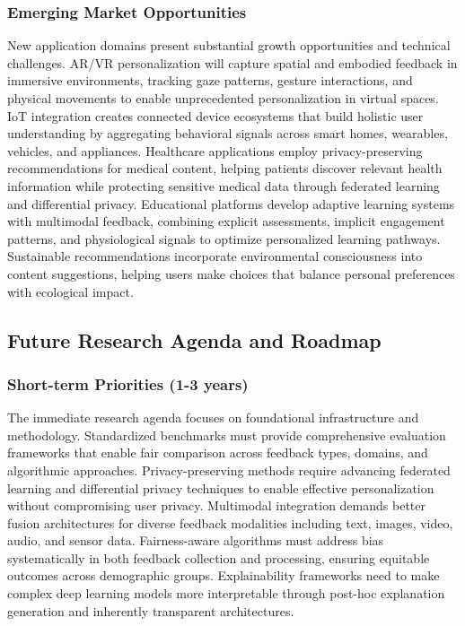 \subsubsection{Emerging Market Opportunities}

New application domains present substantial growth opportunities and technical challenges. AR/VR personalization will capture spatial and embodied feedback in immersive environments, tracking gaze patterns, gesture interactions, and physical movements to enable unprecedented personalization in virtual spaces. IoT integration creates connected device ecosystems that build holistic user understanding by aggregating behavioral signals across smart homes, wearables, vehicles, and appliances. Healthcare applications employ privacy-preserving recommendations for medical content, helping patients discover relevant health information while protecting sensitive medical data through federated learning and differential privacy. Educational platforms develop adaptive learning systems with multimodal feedback, combining explicit assessments, implicit engagement patterns, and physiological signals to optimize personalized learning pathways. Sustainable recommendations incorporate environmental consciousness into content suggestions, helping users make choices that balance personal preferences with ecological impact.

\subsection{Future Research Agenda and Roadmap}

\subsubsection{Short-term Priorities (1-3 years)}

The immediate research agenda focuses on foundational infrastructure and methodology. Standardized benchmarks must provide comprehensive evaluation frameworks that enable fair comparison across feedback types, domains, and algorithmic approaches. Privacy-preserving methods require advancing federated learning and differential privacy techniques to enable effective personalization without compromising user privacy. Multimodal integration demands better fusion architectures for diverse feedback modalities including text, images, video, audio, and sensor data. Fairness-aware algorithms must address bias systematically in both feedback collection and processing, ensuring equitable outcomes across demographic groups. Explainability frameworks need to make complex deep learning models more interpretable through post-hoc explanation generation and inherently transparent architectures.

